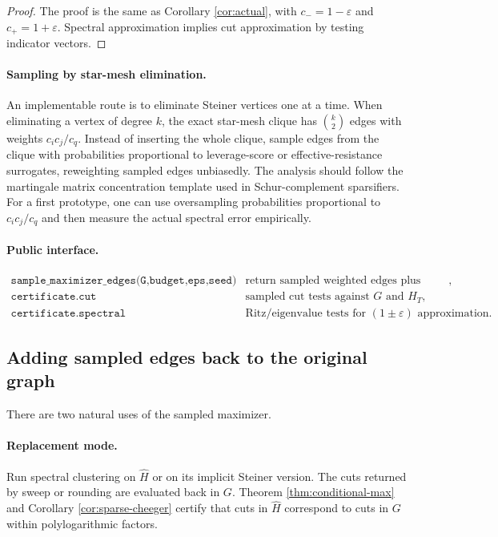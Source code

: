 \documentclass[11pt]{article}
\begin{document}
\begin{proof}
The proof is the same as Corollary \ref{cor:actual}, with
$c_-=1-\varepsilon$ and $c_+=1+\varepsilon$.  Spectral approximation implies
cut approximation by testing indicator vectors.
\end{proof}

\paragraph{Sampling by star-mesh elimination.}
An implementable route is to eliminate Steiner vertices one at a time.  When
eliminating a vertex of degree $k$, the exact star-mesh clique has
$\binom{k}{2}$ edges with weights $c_ic_j/c_q$.  Instead of inserting the
whole clique, sample edges from the clique with probabilities proportional to
leverage-score or effective-resistance surrogates, reweighting sampled edges
unbiasedly.  The analysis should follow the martingale matrix concentration
template used in Schur-complement sparsifiers.  For a first prototype, one
can use oversampling probabilities proportional to $c_ic_j/c_q$ and then
measure the actual spectral error empirically.

\paragraph{Public interface.}
\[
\begin{array}{ll}
\texttt{sample\_maximizer\_edges(G,budget,eps,seed)}
 & \text{return sampled weighted edges plus certificates},\\
\texttt{certificate.cut}
 & \text{sampled cut tests against }G\text{ and }H_T,\\
\texttt{certificate.spectral}
 & \text{Ritz/eigenvalue tests for }(1\pm\varepsilon)\text{ approximation}.
\end{array}
\]

\subsection{Adding sampled edges back to the original graph}

There are two natural uses of the sampled maximizer.

\paragraph{Replacement mode.}
Run spectral clustering on $\widehat H$ or on its implicit Steiner version.
The cuts returned by sweep or rounding are evaluated back in $G$.  Theorem
\ref{thm:conditional-max} and Corollary \ref{cor:sparse-cheeger} certify that
cuts in $\widehat H$ correspond to cuts in $G$ within polylogarithmic factors.
\end{document}

